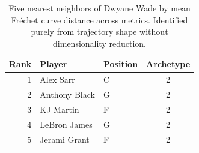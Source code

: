 \begin{table}[htbp]
  \centering\small
  \begin{tabular}{rllc}
    \toprule
    Rank & Player & Position & Archetype \\
    \midrule
    1 & Alex Sarr & C & 2 \\
    2 & Anthony Black & G & 2 \\
    3 & KJ Martin & F & 2 \\
    4 & LeBron James & G & 2 \\
    5 & Jerami Grant & F & 2 \\
    \bottomrule
  \end{tabular}
  \caption{Five nearest neighbors of Dwyane Wade by mean Fr\'{e}chet curve distance across metrics. Identified purely from trajectory shape without dimensionality reduction.}
  \label{tab:Dwyane_Wade_frechet_curve_neighbors}
\end{table}

